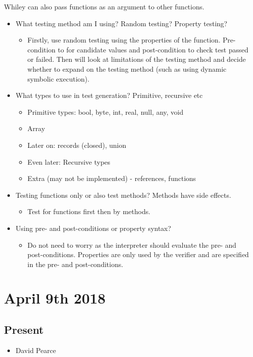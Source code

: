 \documentclass[]{article}
\begin{document}
Whiley can also pass functions as an argument to other functions.
\begin{itemize}
		\item What testing method am I using? Random testing? Property testing?  
		\begin{itemize}
			\item Firstly, use random testing using the properties of the function. Pre-condition to for candidate values and post-condition to check test passed or failed. Then will look at limitations of the testing method and decide whether to expand on the testing method (such as using dynamic symbolic execution).
		\end{itemize}
		\item What types to use in test generation? Primitive, recursive etc
		\begin{itemize}
			\item Primitive types: bool, byte, int, real, null, any, void
			\item Array
			\item Later on: records (closed), union
			\item Even later: Recursive types
			\item Extra (may not be implemented) - references, functions
		\end{itemize}
		\item Testing functions only or also test methods? Methods have side effects.
		\begin{itemize}
			\item Test for functions first then by methods.
		\end{itemize}
		\item Using pre- and post-conditions or property syntax?
		\begin{itemize}
			\item Do not need to worry as the interpreter should evaluate the pre- and post-conditions. Properties are only used by the verifier and are specified in the pre- and post-conditions.
		\end{itemize}
\end{itemize}

\section{April 9th 2018}
\subsection{Present}
\begin{itemize}
	\item David Pearce
\end{itemize}
\end{document}
